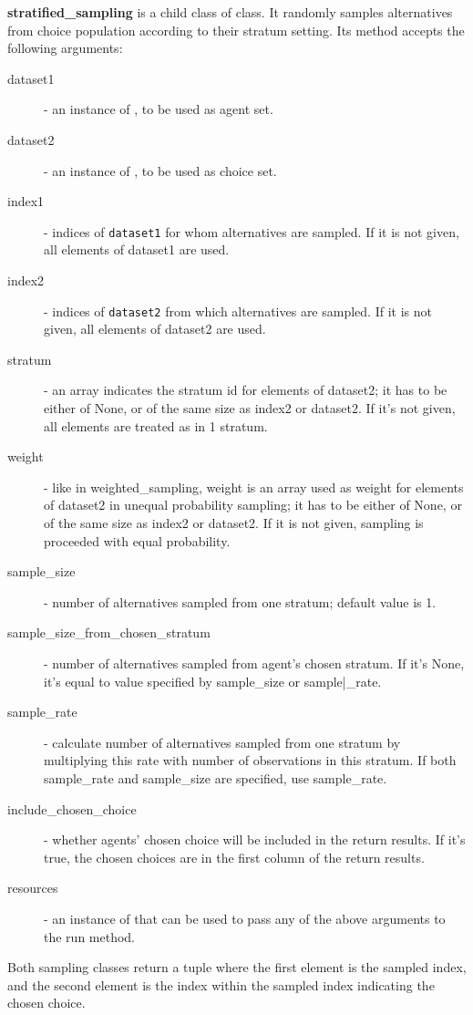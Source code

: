 {\bf stratified_sampling} is a child class of  class.
It randomly samples alternatives from choice population according to
their stratum setting. Its  method accepts the following
arguments:
\begin{description}
\item[dataset1] - an instance of , to be used as agent set.
\item[dataset2] - an instance of , to be used as choice set.
\item[index1] - indices of \verb|dataset1| for whom alternatives are sampled.
If it is not given, all elements of dataset1 are used.
\item[index2] - indices of \verb|dataset2| from which alternatives are
sampled. If it is not given, all elements of dataset2 are used.
\item[stratum] - an array indicates the stratum id for elements of dataset2; it has
to be either of None, or of the same size as index2 or dataset2. If it's not given,
all elements are treated as in 1 stratum.
\item[weight] - like in weighted_sampling, weight is an array used as weight
for elements of dataset2 in unequal probability sampling; it has to be either
of None, or of the same size as index2 or dataset2. If it is not given, sampling
is proceeded with equal probability.
\item[sample_size] - number of alternatives sampled from one stratum; default value is 1.
\item[sample_size_from_chosen_stratum] - number of alternatives sampled from agent's chosen stratum.
If it's None, it's equal to value specified by sample_size or sample|_rate.
\item[sample_rate] - calculate number of alternatives sampled from one stratum by multiplying this rate with
number of observations in this stratum. If both sample_rate and sample_size are specified, use sample_rate.
\item[include_chosen_choice] - whether agents' chosen choice will be included in
the return results. If it's true, the chosen choices are in the first column of
the return results.
\item[resources] - an instance of  that can be used to pass any of
the above arguments to the run method.
\end{description}

Both sampling classes return a tuple where the first element is the sampled index, and the second element is 
the index within the sampled index indicating the chosen choice.

